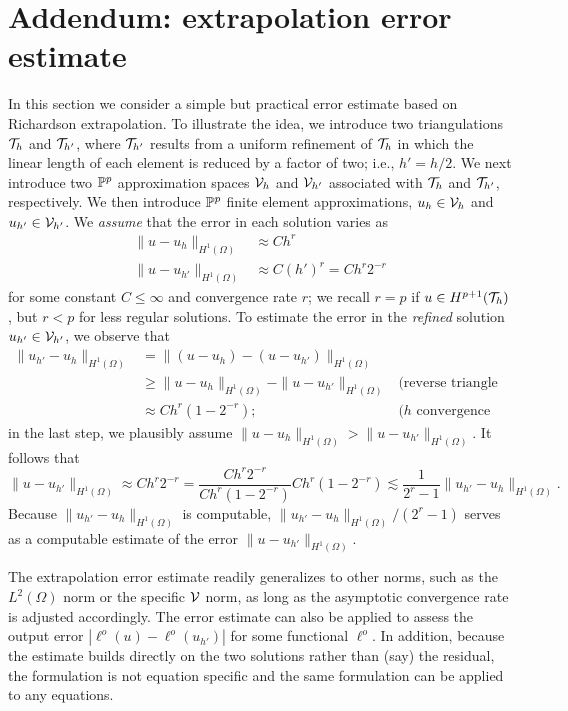 \clearpage
\section{Addendum: extrapolation error estimate}
In this section we consider a simple but practical error estimate based on Richardson extrapolation.  %
To illustrate the idea, we introduce two triangulations $\mathcal{T}_h$ and $\mathcal{T}_{h'}$, where $\mathcal{T}_{h'}$ results from a uniform refinement of $\mathcal{T}_h$ in which the linear length of each element is reduced by a factor of two; i.e., $h' = h/2$. We next introduce two $\mathbb{P}^p$ approximation spaces $\mathcal{V}_h$ and $\mathcal{V}_{h'}$ associated with $\mathcal{T}_h$ and $\mathcal{T}_{h'}$, respectively. We then introduce $\mathbb{P}^p$ finite element approximations, $u_h \in \mathcal{V}_h$ and $u_{h'} \in \mathcal{V}_{h'}$.  We \emph{assume} that the error in each solution varies as
\begin{align*}
  \| u - u_h \|_{H^1(\Omega)} &\approx C h^r \\
  \| u - u_{h'} \|_{H^1(\Omega)} &\approx C (h')^r = C h^r 2^{-r}
\end{align*}
for some constant $C \leq \infty$ and convergence rate $r$; we recall $r = p$ if $u \in H^{p+1}(\mathcal{T}_h)$, but $r < p$ for less regular solutions. To estimate the error in the \emph{refined} solution $u_{h'} \in \mathcal{V}_{h'}$, we observe that
\begin{align*}
  \| u_{h'} - u_h \|_{H^1(\Omega)}
  &= \| (u - u_{h}) - (u - u_{h'}) \|_{H^1(\Omega)}
  \\
  &\geq \| u - u_h \|_{H^1(\Omega)} - \| u - u_{h'} \|_{H^1(\Omega)} & \text{(reverse triangle inequality)}
  \\
  &\approx  C h^r(1-2^{-r}); &\text{($h$ convergence estimate)}  
\end{align*}
in the last step, we plausibly assume $\| u  - u_h \|_{H^1(\Omega)} > \| u - u_{h'} \|_{H^1(\Omega)}$. It follows that
\begin{equation*}
  \| u - u_{h'} \|_{H^1(\Omega)} \approx C h^r 2^{-r}
  = \frac{ C h^r 2^{-r} }{C h^r (1-2^{-r})} C h^r (1-2^{-r})
  \lesssim \frac{1}{2^r - 1} \| u_{h'} - u_h \|_{H^1(\Omega)}.
\end{equation*}
Because $\| u_{h'} - u_h \|_{H^1(\Omega)}$ is computable, $\| u_{h'} - u_h \|_{H^1(\Omega)}/(2^r-1)$ serves as a computable estimate of the error $\| u - u_{h'} \|_{H^1(\Omega)}$.

The extrapolation error estimate readily generalizes to other norms, such as the $L^2(\Omega)$ norm or the specific $\mathcal{V}$ norm, as long as the asymptotic convergence rate is adjusted accordingly. The error estimate can also be applied to assess the output error $| \ell^o(u) - \ell^o(u_{h'}) |$ for some functional $\ell^o$.  In addition, because the estimate builds directly on the two solutions rather than (say) the residual, the formulation is not equation specific and the same formulation can be applied to any equations.

